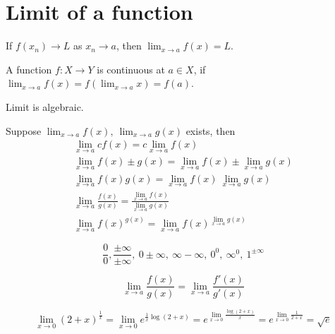 \section{Limit of a function}
\begin{definition}[limit]
	If $f(x_n) \to L$ as $x_n \to a$, then $\displaystyle \lim_{x \to a} f(x) = L$.
\end{definition}

\begin{definition}[continuity]
	A function $f : X \to Y$ is continuous at $a \in X$, if $\displaystyle \lim_{x \to a} f(x) = f(\lim_{x \to a} x) = f(a)$.
\end{definition}

\begin{theorem}
	Limit is algebraic.
\end{theorem}
	Suppose $\displaystyle \lim_{x \to a} f(x),\ \lim_{x \to a} g(x)$ exists, then
\begin{eqnarray}
	\lim_{x \to a} cf(x) = c\lim_{x \to a} f(x) \\
	\lim_{x \to a} f(x) \pm g(x) = \lim_{x \to a} f(x) \pm \lim_{x \to a}g(x) \\
	\lim_{x \to a} f(x)g(x) = \lim_{x \to a}f(x) \ \lim_{x \to a}g(x) \\
	\lim_{x \to a} \frac{f(x)}{g(x)} = \frac{\displaystyle \lim_{x \to a}f(x)}{\displaystyle \lim_{x \to a}g(x)} \\
	\lim_{x \to a} f(x)^{g(x)} = \lim_{x \to a}f(x)^{\displaystyle \lim_{x \to a}g(x)}
\end{eqnarray}

\begin{remark}[exceptions]
	\[ \frac{0}{0}, \frac{\pm \infty}{\pm \infty},\ 0 \pm \infty,\ \infty - \infty,\ 0^0,\ \infty^0,\ 1^{\pm\infty} \]
\end{remark}

\begin{theorem}
	\[ \lim_{x \to a} \frac{f(x)}{g(x)} = \lim_{x \to a} \frac{f'(x)}{g'(x)} \]
\end{theorem}


\begin{remark}[application]
	\[ \lim_{x \to 0} (2+x)^\frac{1}{x} = \lim_{x \to 0} e^{\frac{1}{x} \log (2+x)} = e^{\displaystyle \lim_{x \to 0} \frac{\log(2+x)}{x}} = e^{\displaystyle \lim_{x \to 0} \frac{1}{2+x}} = \sqrt{e} \]
\end{remark}

